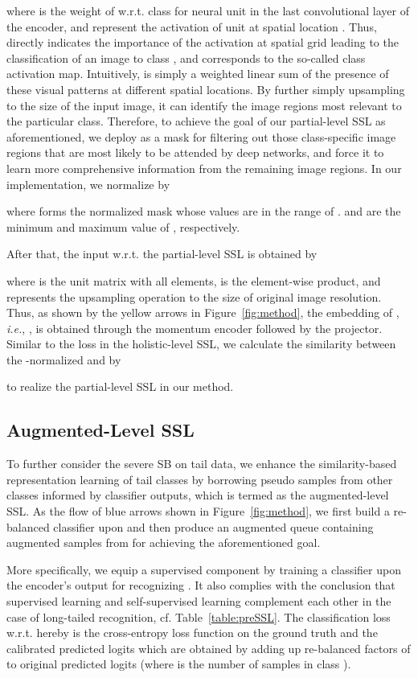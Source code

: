 \documentclass[10pt,journal,compsoc]{IEEEtran}
\newcommand{\ie}{\emph{i.e.}}
\begin{document}
where  is the weight of  w.r.t. class  for neural unit  in the last convolutional layer of the encoder, and  represent the activation of unit  at spatial location . Thus,  directly indicates the importance of the activation at  spatial grid  leading to the classification of an image to class , and  corresponds to the so-called class activation map. Intuitively,  is simply a weighted linear sum of the presence of these visual patterns at different spatial locations. By further simply upsampling  to the size of the input image, it can identify the image regions most relevant to the particular class. Therefore, to achieve the goal of our partial-level SSL as aforementioned, we deploy  as a mask for filtering out those class-specific image regions that are most likely to be attended by deep networks, and force it to learn more comprehensive information from the remaining image regions. In our implementation, we normalize  by

where  forms the normalized mask  whose values are in the range of .  and  are the minimum and maximum value of , respectively.

After that, the input w.r.t. the partial-level SSL  is obtained by

where  is the unit matrix with all  elements,  is the element-wise product, and  represents the upsampling operation to the size of original image resolution. Thus, as shown by the yellow arrows in Figure~\ref{fig:method}, the embedding of , \ie, , is obtained through the momentum encoder followed by the projector. Similar to the loss in the holistic-level SSL, we calculate the similarity between the -normalized  and  by

to realize the partial-level SSL in our method.

\subsection{Augmented-Level SSL}\label{sec:augmentSSL}

To further consider the severe SB on tail data, we enhance the similarity-based representation learning of tail classes by borrowing pseudo samples from other classes informed by classifier outputs, which is termed as the augmented-level SSL. As the flow of blue arrows shown in Figure~\ref{fig:method}, we first build a re-balanced classifier  upon  and then produce an augmented queue containing augmented samples  from  for achieving the aforementioned goal.

More specifically, we equip a supervised component by training a classifier upon the encoder's output for recognizing . It also complies with the conclusion that supervised learning and self-supervised learning complement each other in the case of long-tailed recognition, cf. Table~\ref{table:preSSL}. The classification loss w.r.t.  hereby is the cross-entropy loss function on the ground truth and the calibrated predicted logits which are obtained by adding up re-balanced factors of  to original predicted logits (where  is the number of samples in class ).
\end{document}

